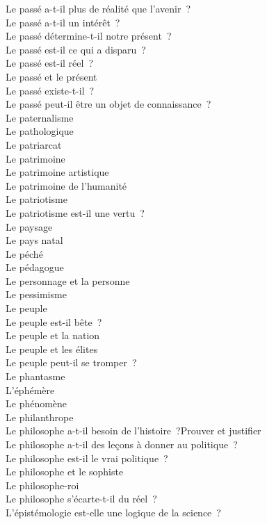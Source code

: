 \documentclass[a4paper,12pt]{article}
\begin{document}
Le passé a-t-il plus de réalité que l'avenir ? \\
Le passé a-t-il un intérêt ? \\
Le passé détermine-t-il notre présent ? \\
Le passé est-il ce qui a disparu ? \\
Le passé est-il réel ? \\
Le passé et le présent \\
Le passé existe-t-il ? \\
Le passé peut-il être un objet de connaissance ? \\
Le paternalisme \\
Le pathologique \\
Le patriarcat \\
Le patrimoine \\
Le patrimoine artistique \\
Le patrimoine de l'humanité \\
Le patriotisme \\
Le patriotisme est-il une vertu ? \\
Le paysage \\
Le pays natal \\
Le péché \\
Le pédagogue \\
Le personnage et la personne \\
Le pessimisme \\
Le peuple \\
Le peuple est-il bête ? \\
Le peuple et la nation \\
Le peuple et les élites \\
Le peuple peut-il se tromper ? \\
Le phantasme \\
L'éphémère \\
Le phénomène \\
Le philanthrope \\
Le philosophe a-t-il besoin de l'histoire ?Prouver et justifier \\
Le philosophe a-t-il des leçons à donner au politique ? \\
Le philosophe est-il le vrai politique ? \\
Le philosophe et le sophiste \\
Le philosophe-roi \\
Le philosophe s'écarte-t-il du réel ? \\
L'épistémologie est-elle une logique de la science ? \\
\end{document}
